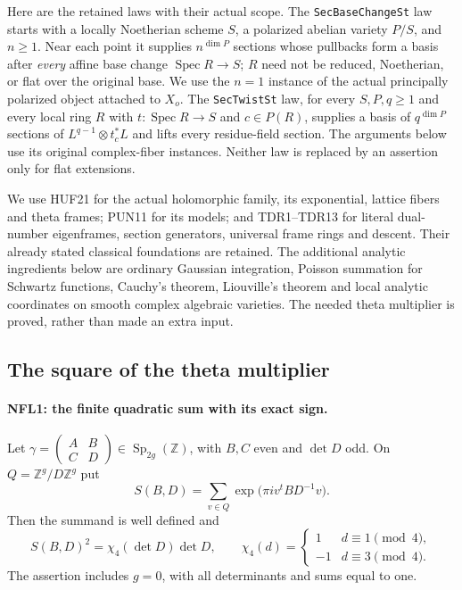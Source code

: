 Here are the retained laws with their actual scope.  The
\texttt{SecBaseChangeSt} law starts with a locally Noetherian scheme
$S$, a polarized abelian variety $P/S$, and $n\ge1$.  Near each
point it supplies $n^{\dim P}$ sections whose pullbacks form a basis
after \emph{every} affine base change $\operatorname{Spec}R\to S$;
$R$ need not be reduced, Noetherian, or flat over the original base.
We use the $n=1$ instance of the actual principally polarized object
attached to $X_o$.  The \texttt{SecTwistSt} law, for every $S,P,q\ge1$
and every local ring $R$ with $t:\operatorname{Spec}R\to S$ and
$c\in P(R)$, supplies a basis of $q^{\dim P}$ sections of
$L^{q-1}\otimes t_c^*L$ and lifts every residue-field section.
The arguments below use its original complex-fiber instances.
Neither law is replaced by an assertion only for flat extensions.

We use HUF21 for the actual holomorphic family, its exponential,
lattice fibers and theta frames; PUN11 for its models; and TDR1--TDR13
for literal dual-number eigenframes, section generators, universal
frame rings and descent.  Their already stated classical foundations
are retained.  The additional analytic ingredients below are ordinary
Gaussian integration, Poisson summation for Schwartz functions,
Cauchy's theorem, Liouville's theorem and local analytic coordinates
on smooth complex algebraic varieties.  The needed theta multiplier
is proved, rather than made an extra input.

\subsection{The square of the theta multiplier}

\paragraph{NFL1: the finite quadratic sum with its exact sign.}
\label{claim:NFL1}
Let $\gamma=\left(\begin{smallmatrix}A&B\\ C&D\end{smallmatrix}\right)
\in\operatorname{Sp}_{2g}(\mathbb Z)$, with $B,C$ even and $\det D$
odd.  On $Q=\mathbb Z^g/D\mathbb Z^g$ put
\[
 S(B,D)=\sum_{v\in Q}\exp\bigl(\pi i v^tBD^{-1}v\bigr).
\]
Then the summand is well defined and
\[
 S(B,D)^2=\chi_4(\det D)\det D,
 \qquad
 \chi_4(d)=\begin{cases}1&d\equiv1\pmod4,\\-1&d\equiv3\pmod4.
 \end{cases}
 \tag{NFL.3}
\]
The assertion includes $g=0$, with all determinants and sums equal
to one.

